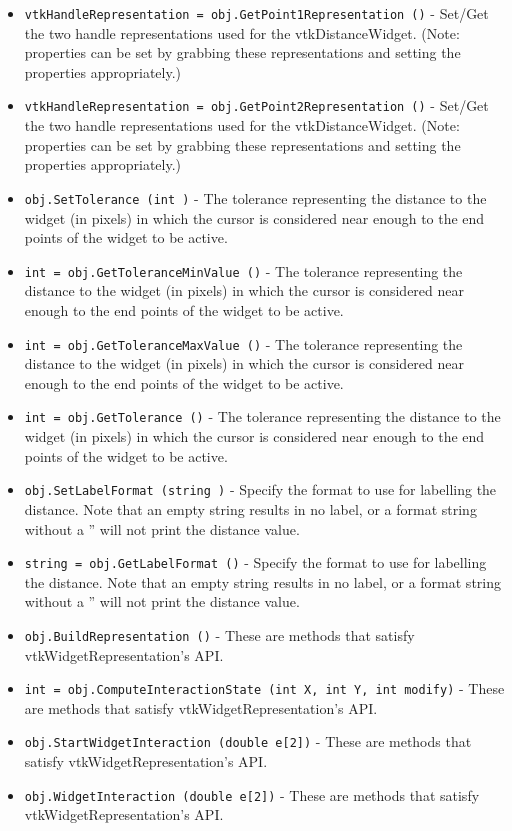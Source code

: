\begin{itemize}
\item  \verb|vtkHandleRepresentation = obj.GetPoint1Representation ()| -  Set/Get the two handle representations used for the vtkDistanceWidget. (Note:
 properties can be set by grabbing these representations and setting the
 properties appropriately.)

\item  \verb|vtkHandleRepresentation = obj.GetPoint2Representation ()| -  Set/Get the two handle representations used for the vtkDistanceWidget. (Note:
 properties can be set by grabbing these representations and setting the
 properties appropriately.)

\item  \verb|obj.SetTolerance (int )| -  The tolerance representing the distance to the widget (in pixels) in
 which the cursor is considered near enough to the end points of
 the widget to be active.

\item  \verb|int = obj.GetToleranceMinValue ()| -  The tolerance representing the distance to the widget (in pixels) in
 which the cursor is considered near enough to the end points of
 the widget to be active.

\item  \verb|int = obj.GetToleranceMaxValue ()| -  The tolerance representing the distance to the widget (in pixels) in
 which the cursor is considered near enough to the end points of
 the widget to be active.

\item  \verb|int = obj.GetTolerance ()| -  The tolerance representing the distance to the widget (in pixels) in
 which the cursor is considered near enough to the end points of
 the widget to be active.

\item  \verb|obj.SetLabelFormat (string )| -  Specify the format to use for labelling the distance. Note that an empty
 string results in no label, or a format string without a ''%
 will not print the distance value.

\item  \verb|string = obj.GetLabelFormat ()| -  Specify the format to use for labelling the distance. Note that an empty
 string results in no label, or a format string without a ''%
 will not print the distance value.

\item  \verb|obj.BuildRepresentation ()| -  These are methods that satisfy vtkWidgetRepresentation's API.

\item  \verb|int = obj.ComputeInteractionState (int X, int Y, int modify)| -  These are methods that satisfy vtkWidgetRepresentation's API.

\item  \verb|obj.StartWidgetInteraction (double e[2])| -  These are methods that satisfy vtkWidgetRepresentation's API.

\item  \verb|obj.WidgetInteraction (double e[2])| -  These are methods that satisfy vtkWidgetRepresentation's API.

\end{itemize}
